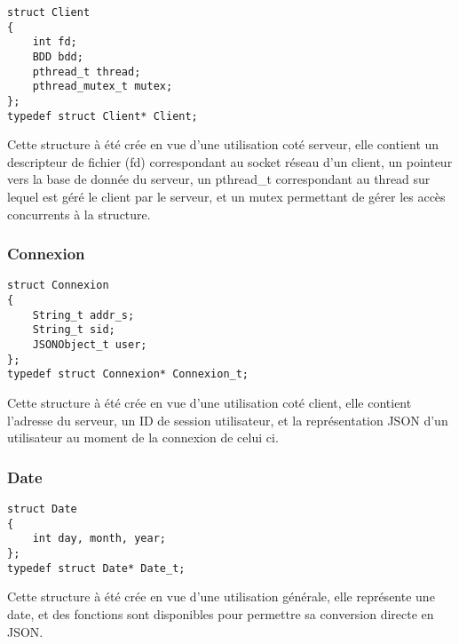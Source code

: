 \begin{lstlisting}
struct Client
{
	int fd;
	BDD bdd;
	pthread_t thread;
	pthread_mutex_t mutex;
};
typedef struct Client* Client;
\end{lstlisting}
Cette structure à été crée en vue d'une utilisation coté serveur, elle contient un descripteur de fichier (fd) correspondant au socket réseau d'un client, un pointeur vers la base de donnée du serveur, un pthread\_t correspondant au thread sur lequel est géré le client par le serveur, et un mutex permettant de gérer les accès concurrents à la structure.
\subsubsection{Connexion}

\begin{lstlisting}
struct Connexion
{
	String_t addr_s;
	String_t sid;
	JSONObject_t user;
};
typedef struct Connexion* Connexion_t;
\end{lstlisting}
Cette structure à été crée en vue d'une utilisation coté client, elle contient l'adresse du serveur, un ID de session utilisateur, et la représentation JSON d'un utilisateur au moment de la connexion de celui ci.
\subsubsection{Date}
\begin{lstlisting}
struct Date
{
	int day, month, year;
};
typedef struct Date* Date_t;
\end{lstlisting}
Cette structure à été crée en vue d'une utilisation générale, elle représente une date, et des fonctions sont disponibles pour permettre sa conversion directe en JSON.


% 
